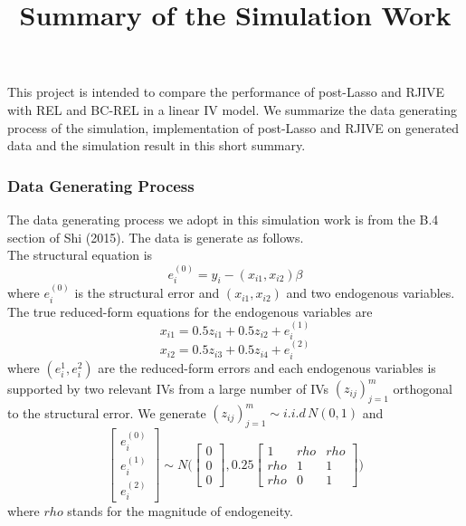 \documentclass[12pt, a4paper]{article}
\title{Summary of the Simulation Work}
\author{}
\begin{document}
\maketitle

This project is intended to compare the performance of post-Lasso \cite{bcch} and RJIVE \cite{rjive} with REL and BC-REL \cite{rel} in a linear IV model. We summarize the data generating process of the simulation, implementation of post-Lasso and RJIVE on generated data and the simulation result in this short summary.  

\subsubsection*{Data Generating Process}

The data generating process we adopt in this simulation work is from the B.4 section of Shi (2015). The data is generate as follows.
\\

\noindent The structural equation is 
\begin{equation}
e_i^{(0)} = y_i - (x_{i1}, x_{i2})\beta
\end{equation}
where $e_i^{(0)}$ is the structural error and $(x_{i1}, x_{i2})$ and two endogenous variables. The true reduced-form equations for the endogenous variables are
\begin{equation}
x_{i1} = 0.5z_{i1} + 0.5 z_{i2} + e_i^{(1)}
\end{equation}
\begin{equation}
x_{i2} = 0.5z_{i3} + 0.5 z_{i4} + e_i^{(2)}
\end{equation}
where $(e_i^{1},e_i^{2})$ are the reduced-form errors and each endogenous variables is supported by two relevant IVs from a large number of IVs $(z_{ij})^m_{j=1}$ orthogonal to the structural error. We generate $(z_{ij})^m_{j=1} \sim i.i.d \, N(0,1)$ and 
\begin{equation} 
\begin{bmatrix} e_i^{(0)} \\ e_i^{(1)} \\ e_i^{(2)} \end{bmatrix} \sim N\Bigg(\begin{bmatrix} 0\\0\\0 \end{bmatrix} , 0.25\begin{bmatrix} 1&rho&rho\\rho&1&1\\rho&0&1 \end{bmatrix}\Bigg)
\end{equation}
where $rho$ stands for the magnitude of endogeneity.\\
\end{document}
